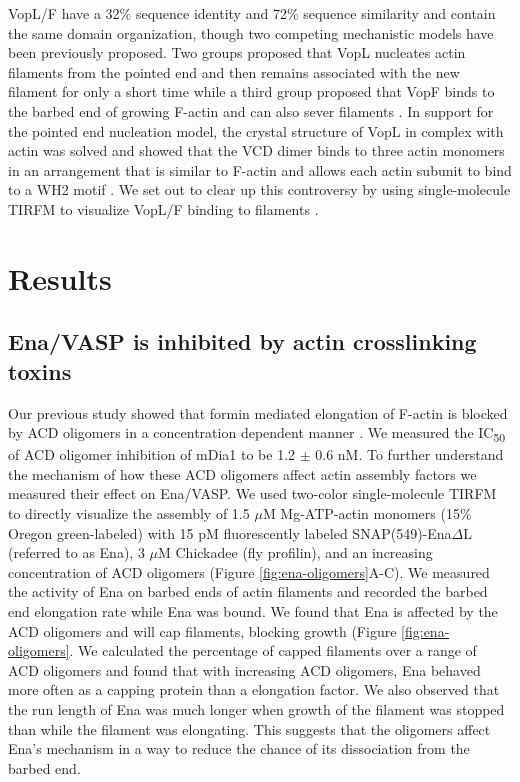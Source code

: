 VopL/F have a 32\% sequence identity and 72\% sequence similarity and contain the same domain organization, though two competing mechanistic models have been previously proposed. Two groups proposed that VopL nucleates actin filaments from the pointed end and then remains associated with the new filament for only a short time \citep{namgoong_mechanism_2011, yu_mechanism_2011} while a third group proposed that VopF binds to the barbed end of growing F-actin and can also sever filaments \citep{pernier_dimeric_2013}. In support for the pointed end nucleation model, the crystal structure of VopL in complex with actin was solved and showed that the VCD dimer binds to three actin monomers in an arrangement that is similar to F-actin and allows each actin subunit to bind to a WH2 motif \citep{zahm_bacterial_2013}. We set out to clear up this controversy by using single-molecule TIRFM to visualize VopL/F binding to filaments \citep{burke_bacterial_2017}. 

\section{Results}\label{ch04-results}

\subsection{Ena/VASP is inhibited by actin crosslinking toxins}\label{ena-acd-oligomers}
Our previous study showed that formin mediated elongation of F-actin is blocked by ACD oligomers in a concentration dependent manner \citep{heisler_acd_2015}. We measured the IC\textsubscript{50} of ACD oligomer inhibition of mDia1 to be 1.2 $\pm$ 0.6 nM. To further understand the mechanism of how these ACD oligomers affect actin assembly factors we measured their effect on Ena/VASP. We used two-color single-molecule TIRFM to directly visualize the assembly of 1.5 $\mu$M Mg-ATP-actin monomers (15\% Oregon green-labeled) with 15 pM fluorescently labeled SNAP(549)-Ena$\Delta$L (referred to as Ena), 3 $\mu$M Chickadee (fly profilin), and an increasing concentration of ACD oligomers (Figure \ref{fig:ena-oligomers}A-C). We measured the activity of Ena on barbed ends of actin filaments and recorded the barbed end elongation rate while Ena was bound. We found that Ena is affected by the ACD oligomers and will cap filaments, blocking growth (Figure \ref{fig:ena-oligomers}. We calculated the percentage of capped filaments over a range of ACD oligomers and found that with increasing ACD oligomers, Ena behaved more often as a capping protein than a elongation factor. We also observed that the run length of Ena was much longer when growth of the filament was stopped than while the filament was elongating. This suggests that the oligomers affect Ena's mechanism in a way to reduce the chance of its dissociation from the barbed end. 

